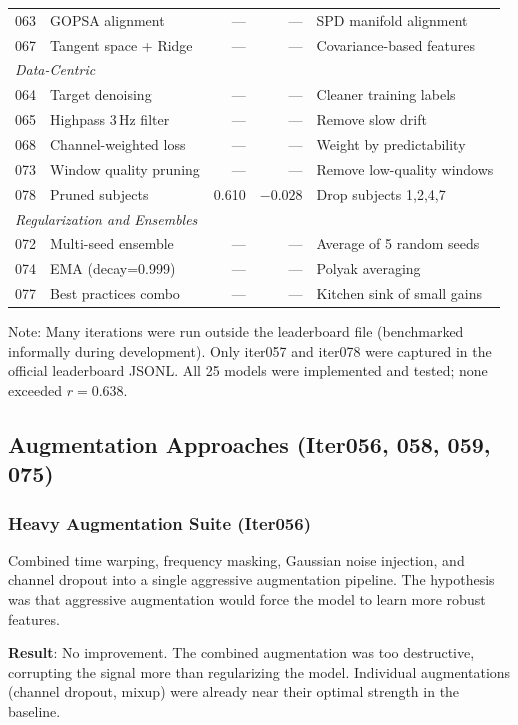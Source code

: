 \documentclass[11pt,a4paper]{article}
\begin{document}
\begin{table}[H]
\begin{tabular}{rlrrl}
063 & GOPSA alignment & --- & --- & SPD manifold alignment \\
067 & Tangent space + Ridge & --- & --- & Covariance-based features \\
\midrule
\multicolumn{5}{l}{\textit{Data-Centric}} \\
064 & Target denoising & --- & --- & Cleaner training labels \\
065 & Highpass 3\,Hz filter & --- & --- & Remove slow drift \\
068 & Channel-weighted loss & --- & --- & Weight by predictability \\
073 & Window quality pruning & --- & --- & Remove low-quality windows \\
078 & Pruned subjects & 0.610 & \textcolor{bad}{$-0.028$} & Drop subjects 1,2,4,7 \\
\midrule
\multicolumn{5}{l}{\textit{Regularization and Ensembles}} \\
072 & Multi-seed ensemble & --- & --- & Average of 5 random seeds \\
074 & EMA (decay=0.999) & --- & --- & Polyak averaging \\
077 & Best practices combo & --- & --- & Kitchen sink of small gains \\
\bottomrule
\end{tabular}
\end{table}

Note: Many iterations were run outside the leaderboard file (benchmarked
informally during development). Only iter057 and iter078 were captured in
the official leaderboard JSONL. All 25 models were implemented and tested;
none exceeded $r = 0.638$.

\subsection{Augmentation Approaches (Iter056, 058, 059, 075)}

\subsubsection{Heavy Augmentation Suite (Iter056)}

Combined time warping, frequency masking, Gaussian noise injection, and
channel dropout into a single aggressive augmentation pipeline. The
hypothesis was that aggressive augmentation would force the model to learn
more robust features.

\textbf{Result}: No improvement. The combined augmentation was too
destructive, corrupting the signal more than regularizing the model.
Individual augmentations (channel dropout, mixup) were already near their
optimal strength in the baseline.
\end{document}
